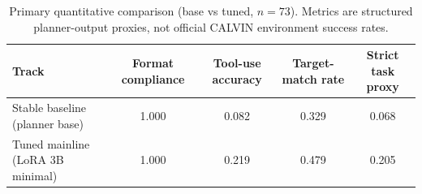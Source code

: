 \begin{table}[t]
\caption{Primary quantitative comparison (base vs tuned, $n=73$). Metrics are structured planner-output proxies, not official CALVIN environment success rates.}
\label{tab:main-quant}
\centering
\begin{tabular}{lcccc}
\toprule
Track & Format compliance & Tool-use accuracy & Target-match rate & Strict task proxy \\
\midrule
Stable baseline (planner base) & 1.000 & 0.082 & 0.329 & 0.068 \\
Tuned mainline (LoRA 3B minimal) & 1.000 & 0.219 & 0.479 & 0.205 \\
\bottomrule
\end{tabular}
\end{table}
